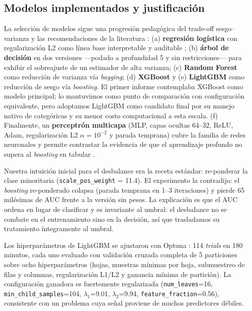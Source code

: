 \documentclass[journal]{IEEEtran}
\begin{document}
\subsection{Modelos implementados y justificación}

La selección de modelos sigue una progresión pedagógica del trade-off sesgo--varianza y las recomendaciones de la literatura \cite{lessmann2015,brown2012}: (a) \textbf{regresión logística} con regularización L2 como línea base interpretable y auditable \cite{dastile2020}; (b) \textbf{árbol de decisión} en dos versiones ---podado a profundidad 5 y sin restricciones--- para exhibir el sobreajuste de un estimador de alta varianza; (c) \textbf{Random Forest} \cite{breiman2001} como reducción de varianza vía \textit{bagging}; (d) \textbf{XGBoost} \cite{chen2016} y (e) \textbf{LightGBM} \cite{ke2017} como reducción de sesgo vía \textit{boosting}. El primer informe contemplaba XGBoost como modelo principal; lo mantuvimos como punto de comparación con configuración equivalente, pero adoptamos LightGBM como candidato final por su manejo nativo de categóricas y su menor costo computacional a esta escala. (f) Finalmente, un \textbf{perceptrón multicapa} (MLP, capas ocultas 64--32, ReLU, Adam, regularización L2 $\alpha=10^{-2}$ y parada temprana) cubre la familia de redes neuronales y permite contrastar la evidencia de que el aprendizaje profundo no supera al \textit{boosting} en tabular \cite{gunnarsson2021}.

Nuestra intuición inicial para el desbalance era la receta estándar: re-ponderar la clase minoritaria (\texttt{scale\_pos\_weight} = 11.4). El experimento la contradijo: el \textit{boosting} re-ponderado colapsa (parada temprana en 1--3 iteraciones) y pierde 65 milésimas de AUC frente a la versión sin pesos. La explicación es que el AUC ordena en lugar de clasificar y es invariante al umbral: el desbalance no se combate en el entrenamiento sino en la decisión, así que trasladamos su tratamiento íntegramente al umbral.

Los hiperparámetros de LightGBM se ajustaron con Optuna \cite{akiba2019,xia2017}: 114 \textit{trials} en 180 minutos, cada uno evaluado con validación cruzada completa de 5 particiones sobre ocho hiperparámetros (hojas, muestras mínimas por hoja, submuestreo de filas y columnas, regularización L1/L2 y ganancia mínima de partición). La configuración ganadora es fuertemente regularizada (\texttt{num\_leaves}=16, \texttt{min\_child\_samples}=104, $\lambda_1$=9.01, $\lambda_2$=9.94, \texttt{feature\_fraction}=0.56), consistente con un problema cuya señal proviene de muchos predictores débiles.
\end{document}
